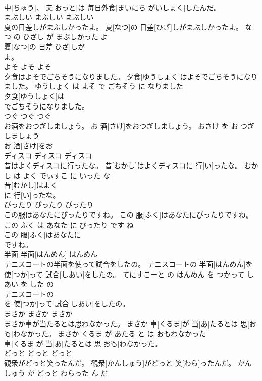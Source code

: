 \documentclass[8pt]{extreport}
\begin{document}
\begin{CJK}{UTF8}{min}
\\	中[ちゅう]、 夫[おっと]は 毎日外食[まいにち がいしょく]したんだ。			
\\	まぶしい	まぶしい	まぶしい	
\\	夏の日差しがまぶしかったよ。	夏[なつ]の 日差[ひざ]しがまぶしかったよ。	なつ の ひざし が まぶしかった よ	
\\	夏[なつ]の 日差[ひざ]しが
\\	よ。			
\\	よそ	よそ	よそ	
\\	夕食はよそでごちそうになりました。	夕食[ゆうしょく]はよそでごちそうになりました。	ゆうしょく は よそ で ごちそう に なりました	
\\	夕食[ゆうしょく]は
\\	でごちそうになりました。			
\\	つぐ	つぐ	つぐ	
\\	お酒をおつぎしましょう。	お 酒[さけ]をおつぎしましょう。	おさけ を お つぎ しましょう	
\\	お 酒[さけ]をお
\\	ディスコ	ディスコ	ディスコ	
\\	昔はよくディスコに行ったな。	昔[むかし]はよくディスコに 行[い]ったな。	むかし は よく でぃすこ に いった な	
\\	昔[むかし]はよく
\\	に 行[い]ったな。			
\\	ぴったり	ぴったり	ぴったり	
\\	この服はあなたにぴったりですね。	この 服[ふく]はあなたにぴったりですね。	この ふく は あなた に ぴったり です ね	
\\	この 服[ふく]はあなたに
\\	ですね。			
\\	半面	半面[はんめん]	はんめん	
\\	テニスコートの半面を使って試合をしたの。	テニスコートの 半面[はんめん]を 使[つか]って 試合[しあい]をしたの。	てにすこーと の はんめん を つかって しあい を した の	
\\	テニスコートの
\\	を 使[つか]って 試合[しあい]をしたの。			
\\	まさか	まさか	まさか	
\\	まさか車が当たるとは思わなかった。	まさか 車[くるま]が 当[あ]たるとは 思[おも]わなかった。	まさか くるま が あたる と は おもわなかった	
\\	車[くるま]が 当[あ]たるとは 思[おも]わなかった。			
\\	どっと	どっと	どっと	
\\	観衆がどっと笑ったんだ。	観衆[かんしゅう]がどっと 笑[わら]ったんだ。	かんしゅう が どっと わらった ん だ	

\end{CJK}
\end{document}
